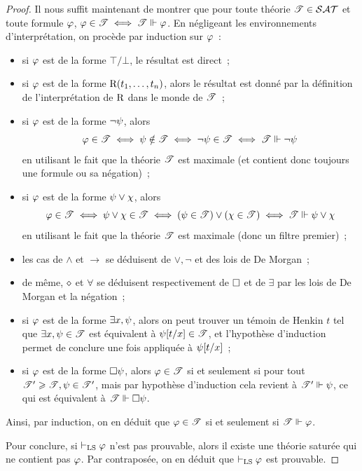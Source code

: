 \begin{proof}
  Il nous suffit maintenant de montrer que pour toute théorie
  $\mathscr T \in \mathcal{SAT}$ et toute formule $\varphi$,
  $\varphi \in \mathscr T \iff \mathscr T\Vdash \varphi$. En négligeant les
  environnements d'interprétation, on procède par induction sur $\varphi$~:
  \begin{itemize}
  \item si $\varphi$ est de la forme $\top/\bot$, le résultat est direct~;
  \item si $\varphi$ est de la forme $\mathrm{R}(t_1,\ldots,t_n)$,
    alors le résultat est donné par la définition de l'interprétation de
    $\mathrm{R}$ dans le monde de $\mathscr T$~;
  \item si $\varphi$ est de la forme $\lnot\psi$, alors
    \[\varphi \in \mathscr T \iff \psi\notin\mathscr T \iff
    \lnot\psi\in\mathscr T \iff \mathscr T \Vdash \lnot\psi\]
    en utilisant le fait que la théorie $\mathscr T$ est maximale (et contient
    donc toujours une formule ou sa négation)~;
  \item si $\varphi$ est de la forme $\psi \lor \chi$, alors
    \[\varphi \in \mathscr T \iff \psi \lor \chi \in \mathscr T \iff
    (\psi \in \mathscr T) \lor (\chi \in \mathscr T) \iff
    \mathscr T\Vdash \psi\lor\chi\]
    en utilisant le fait que la théorie $\mathscr T$ est maximale (donc un
    filtre premier)~;
  \item les cas de $\land$ et $\to$ se déduisent de $\lor,\lnot$ et des lois
    de De Morgan~;
  \item de même, $\mathbin{\diamond}$ et $\forall$ se déduisent respectivement de
    $\mathbin{\square}$ et de $\exists$ par les lois de De Morgan et la négation~;
  \item si $\varphi$ est de la forme $\exists x, \psi$, alors on peut
    trouver un témoin de Henkin $t$ tel que $\exists x, \psi \in \mathscr T$
    est équivalent à $\psi[t/x]\in\mathscr T$, et l'hypothèse d'induction
    permet de conclure une fois appliquée à $\psi[t/x]$~;
  \item si $\varphi$ est de la forme $\mathbin{\square}\psi$, alors
    $\varphi \in \mathscr T$ si et seulement si pour tout
    $\mathscr T' \geqslant \mathscr T, \psi \in \mathscr T'$, mais par hypothèse
    d'induction cela revient à $\mathscr T'\Vdash\psi$, ce qui est
    équivalent à $\mathscr T\Vdash\mathbin{\square} \psi$.
  \end{itemize}
  Ainsi, par induction, on en déduit que $\varphi \in \mathscr T$ si et
  seulement si $\mathscr T \Vdash \varphi$.

  Pour conclure, si $\vdash_{\operatorname{LS}}\varphi$ n'est pas prouvable, alors il existe une
  théorie saturée qui ne contient pas $\varphi$. Par contraposée, on en déduit
  que $\vdash_{\operatorname{LS}}\varphi$ est prouvable.
\end{proof}

